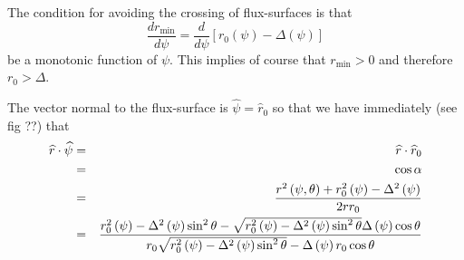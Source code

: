 \documentclass[12pt]{article}
\begin{document}
The condition for avoiding the crossing of flux-surfaces is that 
\begin{equation}
\frac{dr_{\min }}{d\psi }=\frac{d}{d\psi }\left[ r_{0}\left( \psi \right)
-\Delta \left( \psi \right) \right]
\end{equation}
be a monotonic function of $\psi $. This implies of course that $r_{\min }>0$
and therefore $r_{0}>\Delta $.

The vector normal to the flux-surface is $\widehat{\psi }=\widehat{r}_{0}$
so that we have immediately (see fig ??) that 
\begin{eqnarray}
\widehat{r}\cdot \widehat{\psi } &=&\widehat{r}\cdot \widehat{r}_{0} \\
&=&\cos \alpha  \\
&=&\frac{r^{2}\left( \psi ,\theta \right) +r_{0}^{2}\left( \psi \right) -%
\Delta ^{2}\left( \psi \right) }{2rr_{0}} \\
&=&\frac{r_{0}^{2}\left( \psi \right) -\Delta ^{2}\left( \psi \right) \sin
^{2}\theta -\sqrt{r_{0}^{2}\left( \psi \right) -\Delta ^{2}\left( \psi
\right) \sin ^{2}\theta }\Delta \left( \psi \right) \cos \theta }{r_{0}\sqrt{%
r_{0}^{2}\left( \psi \right) -\Delta ^{2}\left( \psi \right) \sin ^{2}\theta 
}-\Delta \left( \psi \right) r_{0}\cos \theta }
\end{eqnarray}
\end{document}
